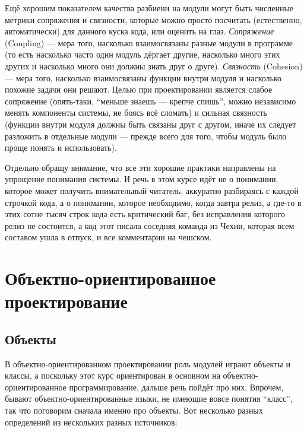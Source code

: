 \documentclass[a5paper]{article}
\begin{document}
Ещё хорошим показателем качества разбиени на модули могут быть численные метрики сопряжения и связности, которые можно просто посчитать (естественно, автоматически) для данного куска кода, или оценить на глаз. \textit{Сопряжение} (Coupling) --- мера того, насколько взаимосвязаны разные модули в программе (то есть насколько часто один модуль дёргает другие, насколько много этих других и насколько много они должны знать друг о друге). \textit{Связность} (Cohesion) --- мера того, насколько взаимосвязаны функции внутри модуля и насколько похожие задачи они решают. Целью при проектировании является слабое сопряжение (опять-таки, ``меньше знаешь --- крепче спишь'', можно независимо менять компоненты системы, не боясь всё сломать) и сильная связность (функции внутри модуля должны быть связаны друг с другом, иначе их следует разложить в отдельные модули --- прежде всего для того, чтобы модуль было проще понять и использовать).

Отдельно обращу внимание, что все эти хорошие практики направлены на упрощение понимания системы. И речь в этом курсе идёт не о понимании, которое может получить внимательный читатель, аккуратно разбираясь с каждой строчкой кода, а о понимании, которое необходимо, когда завтра релиз, а где-то в этих сотне тысяч строк кода есть критический баг, без исправления которого релиз не состоится, а код этот писала соседняя команда из Чехии, которая всем составом ушла в отпуск, и все комментарии на чешском.

\section{Объектно-ориентированное проектирование}

\subsection{Объекты}

В объектно-ориентированном проектировании роль модулей играют объекты и классы, а поскольку этот курс ориентирован в основном на объектно-ориентированное программирование, дальше речь пойдёт про них. Впрочем, бывают объектно-ориентированные языки, не имеющие вовсе понятия ``класс'', так что поговорим сначала именно про объекты. Вот несколько разных определений из нескольких разных источников:
\end{document}
